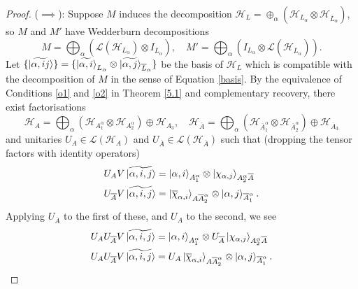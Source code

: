 \documentclass[12pt,a4paper]{report}
\numberwithin{equation}{section}
\newcommand{\ol}[1]{\overline{#1}}
\theoremstyle{definition}
\theoremstyle{theorem}
\theoremstyle{theorem}
\theoremstyle{example}
\theoremstyle{definition}
\begin{document}
\begin{proof}
	($\implies$): Suppose $M$ induces the decomposition $\mathcal{H}_{L}=\oplus_{\alpha}(\mathcal{H}_{L_{\alpha}}\otimes\mathcal{H}_{\ol{L}_{\alpha}})$, so $M$ and $M'$ have Wedderburn decompositions
	\begin{equation}
		M=\bigoplus_{\alpha}(\mathcal{L}(\mathcal{H}_{L_{\alpha}})\otimes I_{\ol{L}_{\alpha}}),\quad M'=\bigoplus_{\alpha}(I_{L_{\alpha}}\otimes\mathcal{L}(\mathcal{H}_{\ol{L}_{\alpha}})).
	\end{equation}
	Let $\{\ket{\widetilde{\alpha,ij}}\}=\{\ket{\widetilde{\alpha,i}}_{L_{\alpha}}\otimes\ket{\widetilde{\alpha,j}}_{\ol{L}_{\alpha}}\}$ be the basis of $\mathcal{H}_{L}$ which is compatible with the decomposition of $M$ in the sense of Equation \ref{basis}. By the equivalence of Conditions \ref{o1} and \ref{o2} in Theorem \ref{5.1} and complementary recovery, there exist factorisations
	\begin{equation}
		\mathcal{H}_{A}=\bigoplus_{\alpha}(\mathcal{H}_{A_{1}^{\alpha}}\otimes\mathcal{H}_{A_{2}^{\alpha}})\oplus\mathcal{H}_{A_{3}},\quad\mathcal{H}_{\ol{A}}=\bigoplus_{\alpha}(\mathcal{H}_{\ol{A}_{1}^{\alpha}}\otimes\mathcal{H}_{\ol{A}_{2}^{\alpha}})\oplus\mathcal{H}_{\ol{A}_{3}}
	\end{equation}
	and unitaries $U_{A}\in\mathcal{L}(\mathcal{H}_{A})$ and $U_{\ol{A}}\in\mathcal{L}(\mathcal{H}_{\ol{A}})$ such that (dropping the tensor factors with identity operators)
	\begin{equation}
		\begin{aligned}
			U_{A}V\ket{\widetilde{\alpha,i,j}}&=\ket{\alpha,i}_{A_{1}^{\alpha}}\otimes\ket{\chi_{\alpha,j}}_{A_{2}^{\alpha}\ol{A}}\\
			U_{\ol{A}}V\ket{\widetilde{\alpha,i,j}}&=\ket{\ol{\chi}_{\alpha,i}}_{A\ol{A}_{2}^{\alpha}}\otimes\ket{\alpha,j}_{\ol{A}_{1}^{\alpha}}.
		\end{aligned}
	\end{equation}
	Applying $U_{\ol{A}}$ to the first of these, and $U_{A}$ to the second, we see
	\begin{equation}\label{333}
		\begin{aligned}
			U_{A}U_{\ol{A}}V\ket{\widetilde{\alpha,i,j}}&=\ket{\alpha,i}_{A_{1}^{\alpha}}\otimes U_{\ol{A}}\ket{\chi_{\alpha,j}}_{A_{2}^{\alpha}\ol{A}}\\
			U_{A}U_{\ol{A}}V\ket{\widetilde{\alpha,i,j}}&=U_{A}\ket{\ol{\chi}_{\alpha,i}}_{A\ol{A}_{2}^{\alpha}}\otimes\ket{\alpha,j}_{\ol{A}_{1}^{\alpha}}.
		\end{aligned}

\end{equation}
\end{proof}
\end{document}
